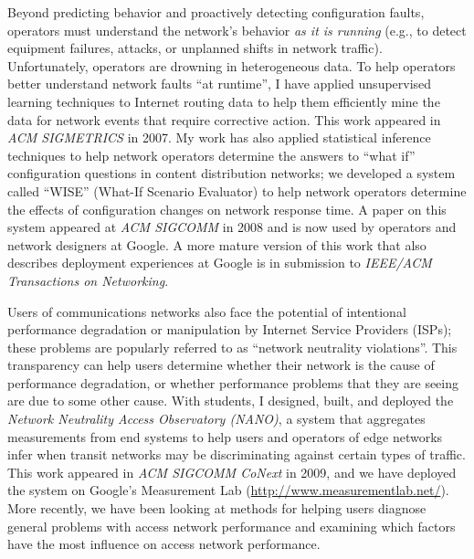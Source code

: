 Beyond predicting behavior and proactively detecting configuration
faults, operators must understand the network's behavior {\em as it is
running} (e.g., to detect equipment failures, attacks, or unplanned
shifts in network traffic).  Unfortunately, operators are drowning in
heterogeneous data.  To help operators better understand network faults
``at runtime'', I have applied unsupervised learning techniques to
Internet routing data to help them efficiently mine the data for network
events that require corrective action.  This work appeared in {\em ACM
SIGMETRICS} in 2007.  My work has also applied statistical inference
techniques to help network operators determine the answers to ``what
if'' configuration questions in content distribution networks; we
developed a system called ``WISE'' (What-If Scenario Evaluator) to help
network operators determine the effects of configuration changes on
network response time.  A paper on this system appeared at {\em ACM
SIGCOMM} in 2008 and is now used by operators and network designers at
Google.  A more mature version of this work that also describes
deployment experiences at Google is in submission to {\em IEEE/ACM
Transactions on Networking}.

Users of communications networks also face the potential of intentional
performance degradation or manipulation by Internet Service Providers
(ISPs); these problems are popularly referred to as ``network neutrality
violations''.  This transparency can help users determine whether their
network is the cause of performance degradation, or whether performance
problems that they are seeing are due to some other cause.  With
students, I designed, built, and deployed the {\em Network Neutrality
Access Observatory (NANO)}, a system that aggregates measurements from
end systems to help users and operators of edge networks infer when
transit networks may be discriminating against certain types of traffic.
This work appeared in {\em ACM SIGCOMM CoNext} in 2009, and we have
deployed the system on Google's Measurement Lab
(\url{http://www.measurementlab.net/}).  More recently, we have been
looking at methods for helping users diagnose general problems with
access network performance and examining which factors have the most
influence on access network performance.

